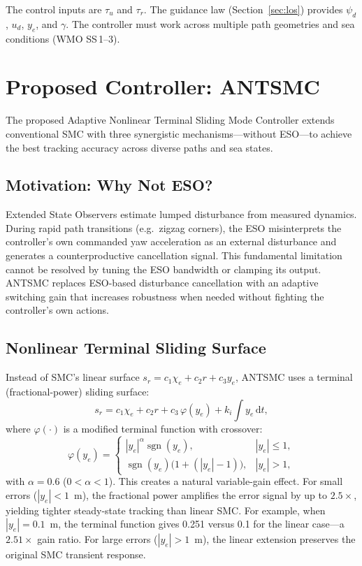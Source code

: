 \documentclass[review]{cas-dc}
\begin{document}
The control inputs are $\tau_u$ and $\tau_r$. The guidance law (Section~\ref{sec:los}) provides $\psi_d$, $u_d$, $y_e$, and $\gamma$. The controller must work across multiple path geometries and sea conditions (WMO SS\,1--3).


\section{Proposed Controller: ANTSMC}
\label{sec:antsmc}

The proposed Adaptive Nonlinear Terminal Sliding Mode Controller extends conventional SMC with three synergistic mechanisms---without ESO---to achieve the best tracking accuracy across diverse paths and sea states.

\subsection{Motivation: Why Not ESO?}
\label{sec:why_no_eso}

Extended State Observers estimate lumped disturbance from measured dynamics. During rapid path transitions (e.g.\ zigzag corners), the ESO misinterprets the controller's own commanded yaw acceleration as an external disturbance and generates a counterproductive cancellation signal. This fundamental limitation cannot be resolved by tuning the ESO bandwidth or clamping its output. ANTSMC replaces ESO-based disturbance cancellation with an adaptive switching gain that increases robustness when needed without fighting the controller's own actions.


\subsection{Nonlinear Terminal Sliding Surface}
\label{sec:terminal_surface}

Instead of SMC's linear surface $s_r = c_1\chi_e + c_2 r + c_3 y_e$, ANTSMC uses a terminal (fractional-power) sliding surface:
\begin{equation}
s_r = c_1\chi_e + c_2 r + c_3\,\varphi(y_e) + k_i\!\int\! y_e\,\mathrm{d}t,
\label{eq:terminal_surface}
\end{equation}
where $\varphi(\cdot)$ is a modified terminal function with crossover:
\begin{equation}
\varphi(y_e) = \begin{cases}
|y_e|^\alpha \operatorname{sgn}(y_e), & |y_e| \leq 1, \\
\operatorname{sgn}(y_e)\big(1 + (|y_e| - 1)\big), & |y_e| > 1,
\end{cases}
\label{eq:phi}
\end{equation}
with $\alpha = 0.6$ ($0 < \alpha < 1$). This creates a natural variable-gain effect. For small errors ($|y_e| < 1$~m), the fractional power amplifies the error signal by up to $2.5\times$, yielding tighter steady-state tracking than linear SMC. For example, when $|y_e| = 0.1$~m, the terminal function gives 0.251 versus 0.1 for the linear case---a $2.51\times$ gain ratio. For large errors ($|y_e| > 1$~m), the linear extension preserves the original SMC transient response.
\end{document}
